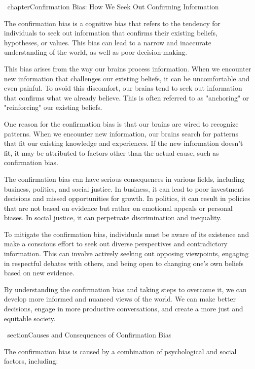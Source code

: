 \ chapter{Confirmation Bias: How We Seek Out Confirming Information}

The confirmation bias is a cognitive bias that refers to the tendency for individuals to seek out information that confirms their existing beliefs, hypotheses, or values. This bias can lead to a narrow and inaccurate understanding of the world, as well as poor decision-making.

This bias arises from the way our brains process information. When we encounter new information that challenges our existing beliefs, it can be uncomfortable and even painful. To avoid this discomfort, our brains tend to seek out information that confirms what we already believe. This is often referred to as "anchoring" or "reinforcing" our existing beliefs.

One reason for the confirmation bias is that our brains are wired to recognize patterns. When we encounter new information, our brains search for patterns that fit our existing knowledge and experiences. If the new information doesn't fit, it may be attributed to factors other than the actual cause, such as confirmation bias.

The confirmation bias can have serious consequences in various fields, including business, politics, and social justice. In business, it can lead to poor investment decisions and missed opportunities for growth. In politics, it can result in policies that are not based on evidence but rather on emotional appeals or personal biases. In social justice, it can perpetuate discrimination and inequality.

To mitigate the confirmation bias, individuals must be aware of its existence and make a conscious effort to seek out diverse perspectives and contradictory information. This can involve actively seeking out opposing viewpoints, engaging in respectful debates with others, and being open to changing one's own beliefs based on new evidence.

By understanding the confirmation bias and taking steps to overcome it, we can develop more informed and nuanced views of the world. We can make better decisions, engage in more productive conversations, and create a more just and equitable society.

\ section{Causes and Consequences of Confirmation Bias}

The confirmation bias is caused by a combination of psychological and social factors, including:

